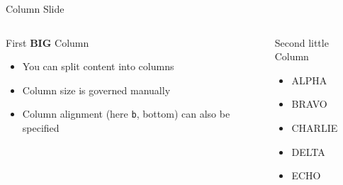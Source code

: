 \documentclass{beamer}
\begin{document}
\begin{frame}{Column Slide}
  \begin{columns}[b]
    \begin{block}{First \textbf{BIG} Column}
      \begin{itemize}
      \item You can split content into columns
      \item Column size is governed manually
      \item Column alignment (here \texttt{b}, bottom) can also be specified
      \end{itemize}
    \end{block}

    \begin{block}{Second {\tiny little} Column}
      \begin{itemize}
      \item ALPHA
      \item BRAVO
      \item CHARLIE
      \item DELTA
      \item ECHO
      \end{itemize}
    \end{block}
  \end{columns}
\end{frame}
\end{document}
